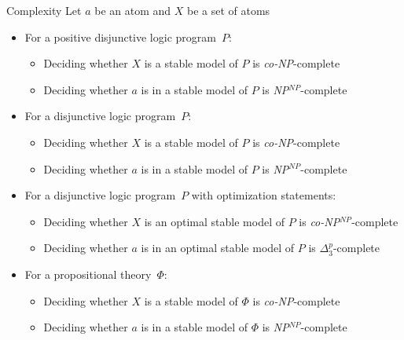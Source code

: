 \begin{frame}{Complexity}
\smallskip
Let $a$ be an atom and $X$ be a set of atoms
\medskip
\begin{itemize}
\item<1-> For a positive disjunctive logic program~$P$:
  \begin{itemize}
  \item Deciding whether $X$ is a stable model of $P$ is
    \textit{co-NP}-complete
  \item Deciding whether $a$ is in a stable model of $P$ is
    \textit{NP}$^{\mathit{NP}}$-complete
  \end{itemize}
\item<1-> For a disjunctive logic program~$P$:
  \begin{itemize}
  \item Deciding whether $X$ is a stable model of $P$ is
    \textit{co-NP}-complete
  \item Deciding whether $a$ is in a stable model of $P$ is
    \textit{NP}$^{\mathit{NP}}$-complete
  \end{itemize}
\item<1-> For a disjunctive logic program~$P$ with optimization statements:
  \begin{itemize}
  \item Deciding whether $X$ is an optimal stable model of $P$ is
    \textit{co-NP}$^{\mathit{NP}}$-complete
  \item Deciding whether $a$ is in an optimal stable model of $P$ is
    $\Delta^p_3$-complete
  \end{itemize}
\item<2-> For a propositional theory~$\Phi$:
  \begin{itemize}
  \item Deciding whether $X$ is a stable model of $\Phi$ is
    \textit{co-NP}-complete
  \item Deciding whether $a$ is in a stable model of $\Phi$ is
    \textit{NP}$^{\mathit{NP}}$-complete
  \end{itemize}
\end{itemize}
\end{frame}
